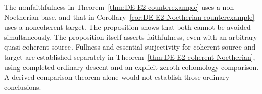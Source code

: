 \begin{remark}\label{rem:DE-E2-coherent-faithfulness-scope}
The nonfaithfulness in Theorem~\ref{thm:DE-E2-counterexample} uses a non-Noetherian base, and that in Corollary~\ref{cor:DE-E2-Noetherian-counterexample} uses a noncoherent target.  The proposition shows that both cannot be avoided simultaneously.  The proposition itself asserts faithfulness, even with an arbitrary quasi-coherent source.  Fullness and essential surjectivity for coherent source and target are established separately in Theorem~\ref{thm:DE-E2-coherent-Noetherian}, using completed ordinary descent and an explicit zeroth-cohomology comparison.  A derived comparison theorem alone would not establish those ordinary conclusions.
\end{remark}
